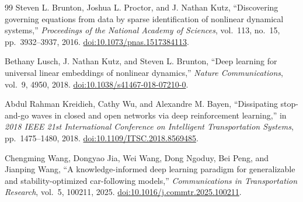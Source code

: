 \documentclass[11pt,a4paper,openany]{book}
\numberwithin{equation}{chapter}
\numberwithin{figure}{chapter}
\numberwithin{table}{chapter}
\begin{document}
\begin{thebibliography}{99}
Steven L. Brunton, Joshua L. Proctor, and J. Nathan Kutz,
``Discovering governing equations from data by sparse identification of nonlinear dynamical systems,''
\emph{Proceedings of the National Academy of Sciences}, vol.~113, no.~15, pp.~3932--3937, 2016.
\href{https://doi.org/10.1073/pnas.1517384113}{doi:10.1073/pnas.1517384113}.

Bethany Lusch, J. Nathan Kutz, and Steven L. Brunton,
``Deep learning for universal linear embeddings of nonlinear dynamics,''
\emph{Nature Communications}, vol.~9, 4950, 2018.
\href{https://doi.org/10.1038/s41467-018-07210-0}{doi:10.1038/s41467-018-07210-0}.

Abdul Rahman Kreidieh, Cathy Wu, and Alexandre M. Bayen,
``Dissipating stop-and-go waves in closed and open networks via deep reinforcement learning,''
in \emph{2018 IEEE 21st International Conference on Intelligent Transportation Systems}, pp.~1475--1480, 2018.
\href{https://doi.org/10.1109/ITSC.2018.8569485}{doi:10.1109/ITSC.2018.8569485}.

Chengming Wang, Dongyao Jia, Wei Wang, Dong Ngoduy, Bei Peng, and Jianping Wang,
``A knowledge-informed deep learning paradigm for generalizable and stability-optimized car-following models,''
\emph{Communications in Transportation Research}, vol.~5, 100211, 2025.
\href{https://doi.org/10.1016/j.commtr.2025.100211}{doi:10.1016/j.commtr.2025.100211}.
\end{thebibliography}
\end{document}
